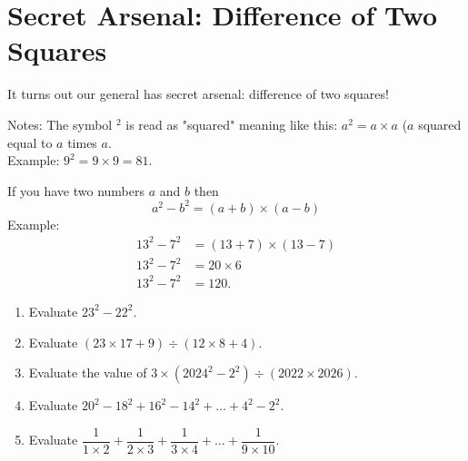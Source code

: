 \documentclass[11pt]{scrartcl}
\begin{document}
\section{Secret Arsenal: Difference of Two Squares}
\begin{tcolorbox}[colback=green!10,colframe=green!75!black]
It turns out our general has secret arsenal: difference of two squares!
\end{tcolorbox}
\begin{remark*}
    Notes: The symbol $^2$ is read as "squared" meaning like this: $a^2 = a \times a$ ($a$ squared equal to $a$ times $a$.\\
    Example: $9^2 = 9 \times 9 = 81$.
\end{remark*}
\begin{lemma*}
    If you have two numbers $a$ and $b$ then $$a^2-b^2 = (a+b) \times (a-b)$$
    Example: 
    \begin{align*}
        13^2-7^2 &= (13+7) \times (13-7)\\
        13^2-7^2 &= 20 \times 6\\
        13^2-7^2 &= \boxed{120}.
    \end{align*}
\end{lemma*}
\begin{enumerate}[resume]
    \item Evaluate $23^2-22^2$.
    \item Evaluate $(23 \times 17 + 9) \div (12 \times 8 + 4).$
    \item Evaluate the value of $3 \times (2024^2 - 2^2) \div (2022 \times 2026)$.
    \item Evaluate $20^2-18^2+16^2-14^2+\dots+4^2-2^2$.
    \item Evaluate $\dfrac{1}{1 \times 2} + \dfrac{1}{2 \times 3} + \dfrac{1}{3 \times 4} + \dots + \dfrac{1}{9 \times 10}$.
\end{enumerate}
\end{document}
